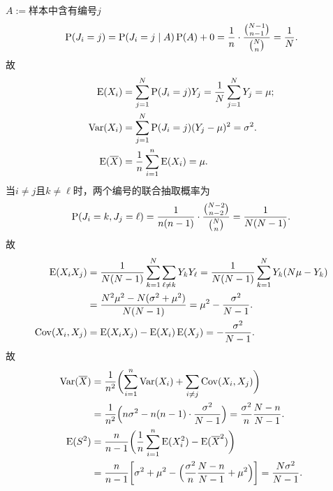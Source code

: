 $A :=$样本中含有编号$j$
\[
	\P(J_i = j) = \P(J_i = j \mid A)\P(A) + 0 = \frac1n \cdot \frac{\binom{N - 1}{n - 1}}{\binom{N}{n}} = \frac1N.
\]
故
\begin{subequations}
	\begin{align}
		\E(X_i) &= \sum_{j=1}^N\P(J_i = j)Y_j = \frac1N\sum_{j=1}^NY_j = \mu;\\
		\Var(X_i) &= \sum_{j=1}^N\P(J_i = j)(Y_j - \mu)^2 = \sigma^2.\\
		\E(\avg X) &= \frac1n\sum_{i=1}^n\E(X_i) = \mu.
	\end{align}
\end{subequations}
当$i \ne j$且$k \ne \ell$时，两个编号的联合抽取概率为
\[
	\P(J_i = k,J_j = \ell) = \frac1{n(n - 1)} \cdot \frac{\binom{N - 2}{n - 2}}{\binom{N}{n}} = \frac1{N(N - 1)}.
\]
故
\begin{align*}
	\E(X_iX_j) &= \frac1{N(N - 1)}\sum_{k=1}^N\sum_{\ell\neq k}Y_kY_\ell = \frac1{N(N - 1)}\sum_{k=1}^NY_k(N\mu - Y_k)\\
	&= \frac{N^2\mu^2 - N(\sigma^2 + \mu^2)}{N(N - 1)} = \mu^2 - \frac{\sigma^2}{N - 1}.\\
	\Cov(X_i,X_j) &= \E(X_iX_j) - \E(X_i)\E(X_j) = -\frac{\sigma^2}{N - 1}.
\end{align*}
故
\begin{equation}\label{eq:ps-finite-population-correction}
    \begin{aligned}
		\Var(\avg X) &= \frac1{n^2}\biggp{\sum_{i=1}^n\Var(X_i) + \sum_{i\neq j}\Cov(X_i,X_j)}\\
		&= \frac1{n^2}\Bigp{n\sigma^2 - n(n - 1) \cdot \frac{\sigma^2}{N - 1}} = \frac{\sigma^2}n\frac{N - n}{N - 1}.\\
		\E(S^2) &= \frac n{n - 1}\biggp{\frac1n\sum_{i=1}^n\E(X_i^2) - \E(\avg X^2)}\\
		&= \frac n{n - 1}\biggb{\sigma^2 + \mu^2 - \Bigp{\frac{\sigma^2}n\frac{N - n}{N - 1} + \mu^2}} = \frac{N\sigma^2}{N - 1}.
    \end{aligned}
\end{equation}
